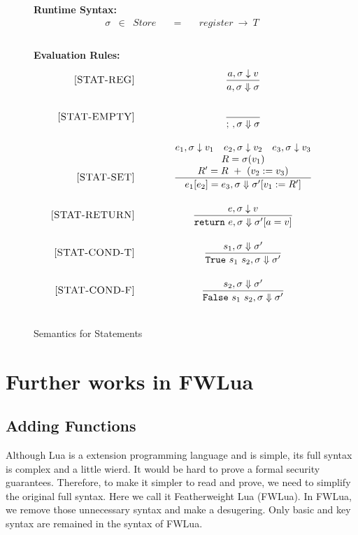 \documentclass{article}
\begin{document}
\newcommand{\semanticStat}[3]{{#1},{#2} \Downarrow {#3}}
\newcommand{\semanticStatRaw}[3]{{#1},{#2} \Downarrow {#3}}

\begin{figure}[H]
\caption{Semantics for Statements}
{\bf Runtime Syntax:}
\label{fig:StatSem}
\[
\begin{array}{rclcl}
  \sigma & \in & {Store} \quad  & = & \quad {register} ~\rightarrow ~{T} \\
  \\
\end{array}
\]

{\bf Evaluation Rules:~~~ \fbox{$\semanticStatRaw{e}{\sigma}{\sigma'}$}} \\
\[
\begin{array}{r@{\qquad\qquad}c}
\ssrule{STAT-REG}{
  \semanticExp{a}{\sigma}{v}
}{
  \semanticStat{a}{\sigma}{\sigma}
}
\ssrule{STAT-EMPTY}{
}{
  \semanticStat{;~}{\sigma}{\sigma}
}
\ssrule{STAT-SET}{
  \semanticExp{e_1}{\sigma}{v_1} \quad
  \semanticExp{e_2}{\sigma}{v_2} \quad
  \semanticExp{e_3}{\sigma}{v_3} \\
  R = \sigma(v_1)\\
  R' = R~+~(v_2 := v_3)
}{
  \semanticStat{e_1[e_2] = e_3}{\sigma}{\sigma'[v_1 := R']}
}
\ssrule{STAT-RETURN}{
  \semanticExp{e}{\sigma}{v} \\ 
}{
  \semanticStat{{\tt return}~e}{\sigma}{\sigma'[a = v]}
}
\ssrule{STAT-COND-T}{
  \semanticStat{s_1}{\sigma}{\sigma'} \\
}{
  \semanticStat{{\tt True} ~s_1 ~s_2}{\sigma}{\sigma'}
}
\ssrule{STAT-COND-F}{
  \semanticStat{s_2}{\sigma}{\sigma'} \\
}{
  \semanticStat{{\tt False} ~s_1 ~s_2}{\sigma}{\sigma'}
}
\end{array}
\]
\end{figure}


\section{Further works in FWLua}
\subsection{Adding Functions}
Although Lua is a extension programming language and is simple, its full syntax is complex and a little wierd. It would be hard to prove a formal security guarantees. Therefore, to make it simpler to read and prove, we need to simplify the original full syntax. Here we call it Featherweight Lua (FWLua). In FWLua, we remove those unnecessary syntax and make a desugering. Only basic and key syntax are remained in the syntax of FWLua.  
\end{document}
